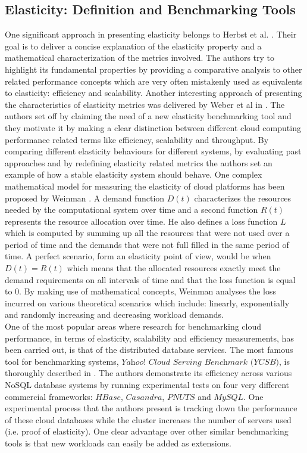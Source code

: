 \documentclass[conference]{IEEEtran}
\begin{document}
\subsection{Elasticity: Definition and Benchmarking Tools}
One significant approach in presenting elasticity belongs to Herbst et al. \cite{herbst2013elasticity}. Their goal is to deliver a concise explanation of the elasticity property and a mathematical characterization of the metrics involved. The authors try to highlight its fundamental properties by providing a comparative analysis to other related performance concepts which are very often mistakenly used as equivalents to elasticity: efficiency and scalability. 
Another interesting approach of presenting the characteristics of elasticity metrics was delivered by Weber et al in \cite{weber2014towards}. The authors set off by claiming the need of a new elasticity benchmarking tool and they motivate it by making a clear distinction between different cloud computing performance related terms like efficiency, scalability and throughput. By comparing different elasticity behaviours for different systems, by evaluating past approaches and by redefining elasticity related metrics the authors set an example of how a stable elasticity system should behave. 
One complex mathematical model for measuring the elasticity of cloud platforms has been proposed by Weinman \cite{weinman2011time}. A demand function $\mathit{D(t)}$ characterizes the resources needed by the computational system over time and a second function $\mathit{R(t)}$ represents the resource allocation over time. He also defines a loss function $\mathit{L}$ which is computed by summing up all the resources that were not used over a period of time and the demands that were not full filled in the same period of time. A perfect scenario, form an elasticity point of view, would be when $\mathit{D(t)=R(t)}$ which means that the allocated resources exactly meet the demand requirements on all intervals of time and that the loss function is equal to $\mathit{0}$. By making use of mathematical concepts, Weinman analyses the loss incurred on various theoretical scenarios which include: linearly, exponentially and randomly increasing and decreasing workload demands.\\
One of the most popular areas where research for benchmarking cloud performance, in terms of elasticity, scalability and efficiency measurements, has been carried out, is that of the distributed database services. The most famous tool for benchmarking systems, $\textit{Yahoo! Cloud Serving Benchmark (YCSB)}$, is thoroughly described in \cite{cooper2010benchmarking}. The authors demonstrate its efficiency across various  NoSQL database systems by running experimental tests on four very different commercial frameworks: $\textit{HBase}$, $\textit{Casandra}$, $\textit{PNUTS}$ and $\textit{MySQL}$. One experimental process that the authors present is tracking down the performance of these cloud databases while the cluster increases the number of servers used (i.e. proof of elasticity). One clear advantage over other similar benchmarking tools is that new workloads can easily be added as extensions.
\end{document}
